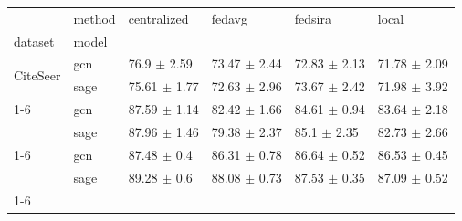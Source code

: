 \begin{tabular}{llllll}
\toprule
 & method & centralized & fedavg & fedsira & local \\
dataset & model &  &  &  &  \\
\midrule
\multirow[t]{2}{*}{CiteSeer} & gcn & 76.9 $\pm$ 2.59 & 73.47 $\pm$ 2.44 & 72.83 $\pm$ 2.13 & 71.78 $\pm$ 2.09 \\
 & sage & 75.61 $\pm$ 1.77 & 72.63 $\pm$ 2.96 & 73.67 $\pm$ 2.42 & 71.98 $\pm$ 3.92 \\
\cline{1-6}
\multirow[t]{2}{*}{Cora} & gcn & 87.59 $\pm$ 1.14 & 82.42 $\pm$ 1.66 & 84.61 $\pm$ 0.94 & 83.64 $\pm$ 2.18 \\
 & sage & 87.96 $\pm$ 1.46 & 79.38 $\pm$ 2.37 & 85.1 $\pm$ 2.35 & 82.73 $\pm$ 2.66 \\
\cline{1-6}
\multirow[t]{2}{*}{PubMed} & gcn & 87.48 $\pm$ 0.4 & 86.31 $\pm$ 0.78 & 86.64 $\pm$ 0.52 & 86.53 $\pm$ 0.45 \\
 & sage & 89.28 $\pm$ 0.6 & 88.08 $\pm$ 0.73 & 87.53 $\pm$ 0.35 & 87.09 $\pm$ 0.52 \\
\cline{1-6}
\bottomrule
\end{tabular}
